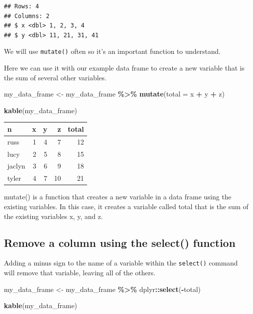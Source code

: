 \documentclass[
  12pt,
]{book}
\newenvironment{Shaded}{\begin{snugshade}}{\end{snugshade}}
\newcommand{\AttributeTok}[1]{\textcolor[rgb]{0.13,0.29,0.53}{#1}}
\newcommand{\FunctionTok}[1]{\textcolor[rgb]{0.13,0.29,0.53}{\textbf{#1}}}
\newcommand{\NormalTok}[1]{#1}
\newcommand{\OtherTok}[1]{\textcolor[rgb]{0.56,0.35,0.01}{#1}}
\newcommand{\SpecialCharTok}[1]{\textcolor[rgb]{0.81,0.36,0.00}{\textbf{#1}}}
\begin{document}
\begin{verbatim}
## Rows: 4
## Columns: 2
## $ x <dbl> 1, 2, 3, 4
## $ y <dbl> 11, 21, 31, 41
\end{verbatim}

We will use \texttt{mutate()} often so it's an important function to understand.

Here we can use it with our example data frame to create a new variable that is the sum of several other variables.

\begin{Shaded}
\begin{Highlighting}[]
\NormalTok{my\_data\_frame }\OtherTok{\textless{}{-}} 
\NormalTok{  my\_data\_frame }\SpecialCharTok{\%\textgreater{}\%}
  \FunctionTok{mutate}\NormalTok{(}\AttributeTok{total =}\NormalTok{ x }\SpecialCharTok{+}\NormalTok{ y }\SpecialCharTok{+}\NormalTok{ z)}

\FunctionTok{kable}\NormalTok{(my\_data\_frame)}
\end{Highlighting}
\end{Shaded}

\begin{tabular}{l|r|r|r|r}
\hline
n & x & y & z & total\\
\hline
russ & 1 & 4 & 7 & 12\\
\hline
lucy & 2 & 5 & 8 & 15\\
\hline
jaclyn & 3 & 6 & 9 & 18\\
\hline
tyler & 4 & 7 & 10 & 21\\
\hline
\end{tabular}

mutate() is a function that creates a new variable in a data frame using the existing variables. In this case, it creates a variable called total that is the sum of the existing variables x, y, and z.

\hypertarget{remove-a-column-using-the-select-function}{%
\subsection{Remove a column using the select() function}\label{remove-a-column-using-the-select-function}}

Adding a minus sign to the name of a variable within the \texttt{select()} command will remove that variable, leaving all of the others.

\begin{Shaded}
\begin{Highlighting}[]
\NormalTok{my\_data\_frame }\OtherTok{\textless{}{-}} 
\NormalTok{  my\_data\_frame }\SpecialCharTok{\%\textgreater{}\%}
\NormalTok{  dplyr}\SpecialCharTok{::}\FunctionTok{select}\NormalTok{(}\SpecialCharTok{{-}}\NormalTok{total)}

\FunctionTok{kable}\NormalTok{(my\_data\_frame)}
\end{Highlighting}
\end{Shaded}
\end{document}
